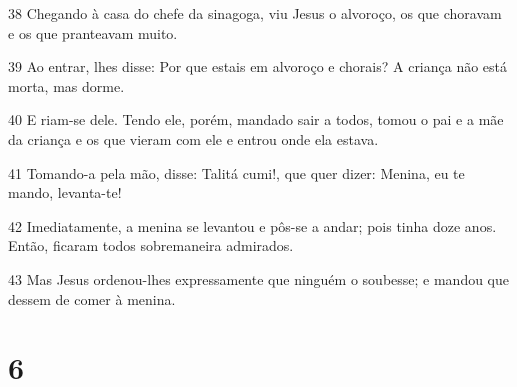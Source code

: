 \par 38 Chegando à casa do chefe da sinagoga, viu Jesus o alvoroço, os que choravam e os que pranteavam muito.
\par 39 Ao entrar, lhes disse: Por que estais em alvoroço e chorais? A criança não está morta, mas dorme.
\par 40 E riam-se dele. Tendo ele, porém, mandado sair a todos, tomou o pai e a mãe da criança e os que vieram com ele e entrou onde ela estava.
\par 41 Tomando-a pela mão, disse: Talitá cumi!, que quer dizer: Menina, eu te mando, levanta-te!
\par 42 Imediatamente, a menina se levantou e pôs-se a andar; pois tinha doze anos. Então, ficaram todos sobremaneira admirados.
\par 43 Mas Jesus ordenou-lhes expressamente que ninguém o soubesse; e mandou que dessem de comer à menina.

\chapter{6}

